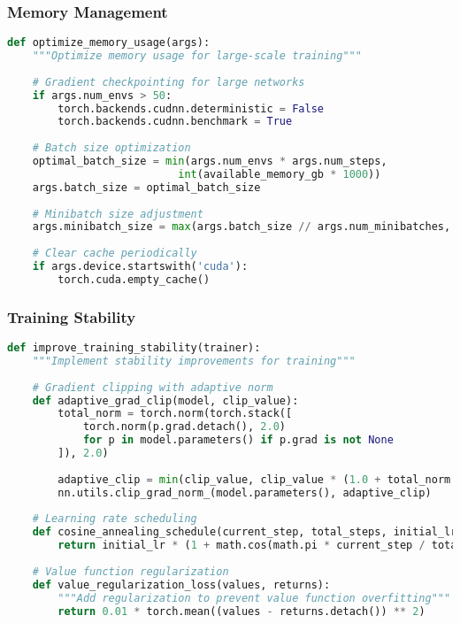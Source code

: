 \documentclass[12pt,a4paper]{article}
\begin{document}
\subsubsection{Memory Management}
\begin{lstlisting}[language=Python, caption=Memory Optimization]
def optimize_memory_usage(args):
    """Optimize memory usage for large-scale training"""
    
    # Gradient checkpointing for large networks
    if args.num_envs > 50:
        torch.backends.cudnn.deterministic = False
        torch.backends.cudnn.benchmark = True
    
    # Batch size optimization
    optimal_batch_size = min(args.num_envs * args.num_steps, 
                           int(available_memory_gb * 1000))
    args.batch_size = optimal_batch_size
    
    # Minibatch size adjustment
    args.minibatch_size = max(args.batch_size // args.num_minibatches, 32)
    
    # Clear cache periodically
    if args.device.startswith('cuda'):
        torch.cuda.empty_cache()
\end{lstlisting}

\subsubsection{Training Stability}
\begin{lstlisting}[language=Python, caption=Training Stability Improvements]
def improve_training_stability(trainer):
    """Implement stability improvements for training"""
    
    # Gradient clipping with adaptive norm
    def adaptive_grad_clip(model, clip_value):
        total_norm = torch.norm(torch.stack([
            torch.norm(p.grad.detach(), 2.0) 
            for p in model.parameters() if p.grad is not None
        ]), 2.0)
        
        adaptive_clip = min(clip_value, clip_value * (1.0 + total_norm.item() / 10.0))
        nn.utils.clip_grad_norm_(model.parameters(), adaptive_clip)
    
    # Learning rate scheduling
    def cosine_annealing_schedule(current_step, total_steps, initial_lr):
        return initial_lr * (1 + math.cos(math.pi * current_step / total_steps)) / 2
    
    # Value function regularization
    def value_regularization_loss(values, returns):
        """Add regularization to prevent value function overfitting"""
        return 0.01 * torch.mean((values - returns.detach()) ** 2)
\end{lstlisting}
\end{document}
